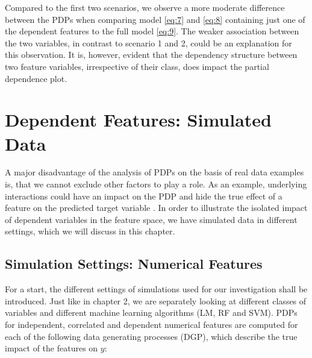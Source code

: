 \documentclass[]{krantz}
\begin{document}
Compared to the first two scenarios, we observe a more moderate
difference between the PDPs when comparing model \eqref{eq:7} and
\eqref{eq:8} containing just one of the dependent features to the full
model \eqref{eq:9}. The weaker association between the two variables, in
contrast to scenario 1 and 2, could be an explanation for this
observation. It is, however, evident that the dependency structure
between two feature variables, irrespective of their class, does impact
the partial dependence plot.

\section{Dependent Features: Simulated Data}\label{SimulatedData}

A major disadvantage of the analysis of PDPs on the basis of real data
examples is, that we cannot exclude other factors to play a role. As an
example, underlying interactions could have an impact on the PDP and
hide the true effect of a feature on the predicted target variable
\citep{molnar2019}. In order to illustrate the isolated impact of
dependent variables in the feature space, we have simulated data in
different settings, which we will discuss in this chapter.

\subsection{Simulation Settings: Numerical
Features}\label{simulation-settings-numerical-features}

For a start, the different settings of simulations used for our
investigation shall be introduced. Just like in chapter 2, we are
separately looking at different classes of variables and different
machine learning algorithms (LM, RF and SVM). PDPs for independent,
correlated and dependent numerical features are computed for each of the
following data generating processes (DGP), which describe the true
impact of the features on \(y\):
\end{document}
